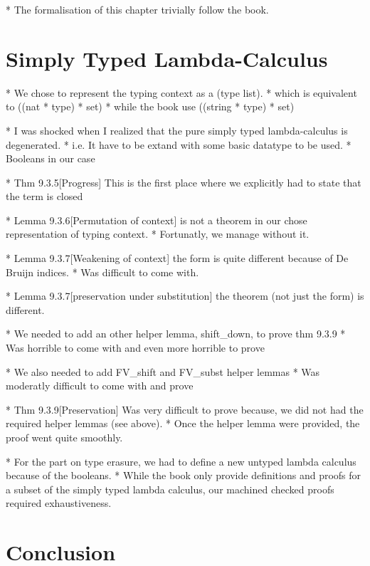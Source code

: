 \documentclass[a4paper, oneside, 12pt, titlepage]{article}
\begin{document}
  * The formalisation of this chapter trivially follow the book.

\section{Simply Typed Lambda-Calculus}
\label{sec:simply-typed-lambda-calculus}

  * We chose to represent the typing context as a (type list).
    * which is equivalent to ((nat * type) * set)
    * while the book use ((string * type) * set)

  * I was shocked when I realized that the pure simply typed lambda-calculus is degenerated.
    * i.e. It have to be extand with some basic datatype to be used.
    * Booleans in our case

  * Thm 9.3.5[Progress] This is the first place where we explicitly had to state that the term is
    closed

  * Lemma 9.3.6[Permutation of context] is not a theorem in our chose representation of typing
    context.
    * Fortunatly, we manage without it.

  * Lemma 9.3.7[Weakening of context] the form is quite different because of De Bruijn indices.
    * Was difficult to come with.

  * Lemma 9.3.7[preservation under substitution] the theorem (not just the form) is different.

  * We needed to add an other helper lemma, shift\_down, to prove thm 9.3.9
    * Was horrible to come with and even more horrible to prove

  * We also needed to add FV\_shift and FV\_subst helper lemmas
    * Was moderatly difficult to come with and prove

  * Thm 9.3.9[Preservation] Was very difficult to prove because, we did not had the required helper
    lemmas (see above).
    * Once the helper lemma were provided, the proof went quite smoothly.

  * For the part on type erasure, we had to define a new untyped lambda calculus because of the
    booleans.
    * While the book only provide definitions and proofs for a subset of the simply typed lambda
      calculus, our machined checked proofs required exhaustiveness.

\section{Conclusion}
\end{document}
